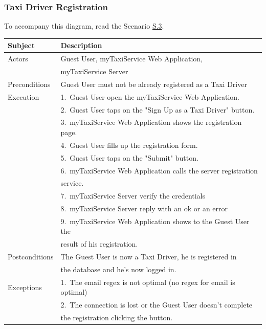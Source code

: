 \subsubsection{Taxi Driver Registration}
			To accompany this diagram, read the Scenario \hyperref[sec:TaxiDriverRegistrationScenario]{S.3}.

				\begin{table}[htpb]
					\centering
					\label{tab:TaxiDriverRegistrationDiagramTable}
					\begin{tabularx}{\textwidth}{lp{9cm}}
						\hline
						\hline
							\textbf{Subject}
						& 
							\textbf{Description}\\
						\hline
							Actors	       &  Guest User, myTaxiService Web Application, \\
										   &  myTaxiService Server\\
						\hline
							Preconditions  &  Guest User must not be already registered as a Taxi Driver\\
						\hline
							Execution      &  1.~Guest User open the myTaxiService Web Application.\\
										   &  2.~Guest User taps on the "Sign Up as a Taxi Driver" button.\\
										   &  3.~myTaxiService Web Application shows the registration page.\\
										   &  4.~Guest User fills up the registration form.\\
										   &  5.~Guest User taps on the "Submit" button.\\
										   &  6.~myTaxiService Web Application calls the server registration\\
										   &     service.\\
										   &  7.~myTaxiService Server verify the credentials\\
										   &  8.~myTaxiService Server reply with an ok or an error\\
										   &  9.~myTaxiService Web Application shows to the Guest User the\\
										   &     result of his registration.\\
						\hline
							Postconditions &  The Guest User is now a Taxi Driver, he is registered in \\ 
										   &  the database and he's now logged in.\\
						\hline
							Exceptions     &  1.~The email regex is not optimal (no regex for email is optimal)\\
										   &  2.~The connection is lost or the Guest User doesn't complete\\ 
										   &     the registration clicking the button.\\
									
						\hline
						\hline
					\end{tabularx}
				\end{table}
				

